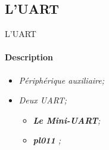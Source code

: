 \documentclass[french]{beamer}
\begin{document}
\subsection{L'UART}
\begin{frame}
	\transsplitverticalout
\end{frame}
\begin{frame}{L'UART}
	\framesubtitle{Description}
	\begin{beamerboxesrounded}[scheme=blocgrisclair]{}
		\begin{center}
			\begin{itemize}
				\color{nb}
				\large
				\item<1-> \textit{Périphérique auxiliaire;}
				\item<2-> \textit{Deux UART;}
				\begin{itemize}
					\color{white}
					\item<3-> \textit{\textbf{Le Mini-UART};}
					\item<4-> \textit{\textbf{pl011} ;}
				\end{itemize}
			\end{itemize}
		\end{center}
	\end{beamerboxesrounded}
\end{frame}
\end{document}
